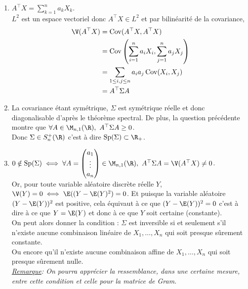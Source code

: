 \documentclass[8pt]{book}
\begin{document}
	\begin{enumerate}
		\item $A^\top X=\displaystyle\sum\limits_{k=1}^na_kX_k$.\\
		$L^2$ est un espace vectoriel donc $A^\top X\in L^2$ et par bilinéarité de la covariance,
		\begin{align*}
			\V(A^\top X)&=\operatorname{Cov}(A^\top X,A^\top X)\\
			&=\operatorname{Cov}\left(\sum\limits_{i=1}^na_iX_i,\sum\limits_{j=1}^na_jX_j\right)\\
			&=\sum\limits_{1\leq i,j\leq n}a_ia_j\operatorname{Cov}(X_i,X_j)\\
			&=A^\top\Sigma A
		\end{align*}
		\item La covariance étant symétrique, $\Sigma$ est symétrique réelle et donc diagonalisable d'après le théorème spectral. De plus, la question précédente montre que $\forall A\in \M_{n,1}(\R),\ A^\top\Sigma A\geq 0$.\\
		Donc $\Sigma \in S_n^+(\R)$ c'est à dire $\operatorname{Sp}(\Sigma)\subset \R_+$.
		\item $0\notin \operatorname{Sp}(\Sigma)\iff \forall A=\begin{pmatrix} a_1\\ \vdots\\ a_n \end{pmatrix}\in \M_{n,1}(\R),\ A^\top\Sigma A=\V(A^\top X)\ne 0$.\\
		Or, pour toute variable aléatoire discrète réelle $Y$, $\V(Y)=0\iff \E((Y-\E(Y)^2)=0$. Et puisque la variable aléatoire $(Y-\E(Y))^2$ est positive, cela équivaut à ce que $(Y-\E(Y))^2=0$ c'est à dire à ce que $Y=\E(Y)$ et donc à ce que $Y$ soit certaine (constante).\\
		On peut alors donner la condition : $\Sigma$ est inversible si et seulement s'il n'existe aucune combinaison linéaire de $X_1,\dots,X_n$ qui soit presque sûrement constante.\\
		Ou encore qu'il n'existe aucune combinaison affine de $X_1,\dots,X_n$ qui soit presque sûrement nulle.\\
		\textit{\underline{Remarque}: On pourra apprécier la ressemblance, dans une certaine mesure, entre cette condition et celle pour la matrice de Gram.}
	\end{enumerate}
	
	
\end{document}
